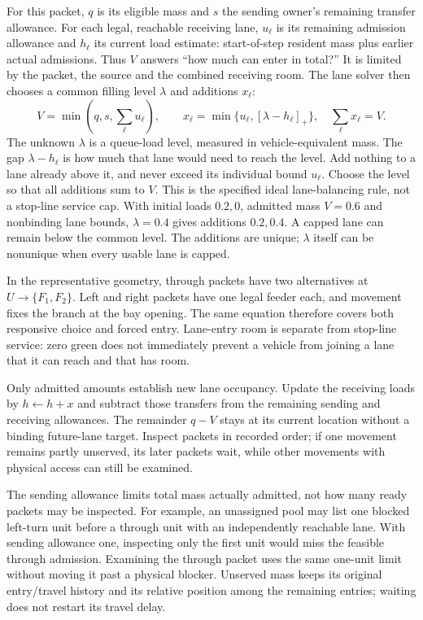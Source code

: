 \documentclass[10pt,a4paper]{article}
\begin{document}
For this packet, $q$ is its eligible mass and $s$ the sending owner's
remaining transfer allowance. For each legal, reachable receiving lane,
$u_\ell$ is its remaining admission allowance and $h_\ell$ its current
load estimate: start-of-step resident mass plus earlier actual admissions.
Thus $V$ answers ``how much can enter in total?'' It is limited by the
packet, the source and the combined receiving room. The lane solver then
chooses a common filling level $\lambda$ and additions $x_\ell$:
\begin{equation}
 V=\min(q,s,\sum_\ell u_\ell),\qquad
 x_\ell=\min\{u_\ell,[\lambda-h_\ell]_+\},\quad
 \sum_\ell x_\ell=V .
 \label{eq:compact-allocation}
\end{equation}
The unknown $\lambda$ is a queue-load level, measured in vehicle-equivalent
mass. The gap $\lambda-h_\ell$ is how much that lane would need to reach
the level. Add nothing to a lane already above it, and never exceed its
individual bound $u_\ell$. Choose the level so that all additions sum to
$V$. This is the specified ideal lane-balancing rule, not a stop-line
service cap. With initial loads $0.2,0$, admitted mass $V=0.6$ and
nonbinding lane bounds, $\lambda=0.4$ gives additions $0.2,0.4$.
A capped lane can remain below the common level. The additions are unique;
$\lambda$ itself can be nonunique when every usable lane is capped.

In the representative geometry, through packets have two alternatives
at $U\to\{F_1,F_2\}$. Left and right packets have one legal feeder each,
and movement fixes the branch at the bay opening. The same equation
therefore covers both responsive choice and forced entry. Lane-entry
room is separate from stop-line service: zero green does not immediately
prevent a vehicle from joining a lane that it can reach and that has room.

Only admitted amounts establish new lane occupancy. Update the receiving
loads by $h\leftarrow h+x$ and subtract those transfers from the remaining
sending and receiving allowances. The remainder $q-V$ stays at its current
location without a binding future-lane target. Inspect packets in recorded
order; if one movement remains partly unserved, its later packets wait,
while other movements with physical access can still be examined.

\par\begin{samepage}
The sending allowance limits total mass actually admitted, not how many
ready packets may be inspected. For example, an unassigned pool may list
one blocked left-turn unit before a through unit with an independently
reachable lane. With sending allowance one, inspecting only the first
unit would miss the feasible through admission. Examining the through
packet uses the same one-unit limit without moving it past a physical
blocker. Unserved mass keeps its original entry/travel history and its
relative position among the remaining entries; waiting does not restart
its travel delay.
\par\end{samepage}
\end{document}
